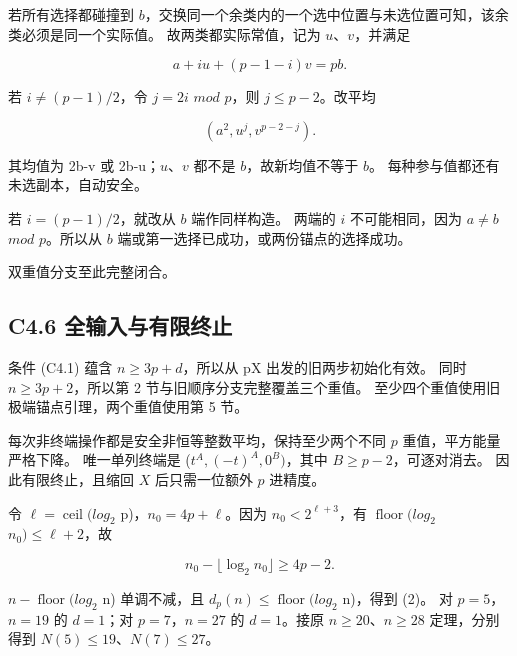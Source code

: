 {若所有选择都碰撞到} {\ensuremath{b}，交换同一个余类内的一个选中位置与未选位置可知，该余类必须是同一个实际值。} {故两类都实际常值，记为} {\ensuremath{u}、\ensuremath{v}，并满足}

\[
a+i u+(p-1-i)v=pb.
\tag{C4.12}
\]

{若} {\ensuremath{i\ne (p-1)/2}，令} {\ensuremath{j=2i}} {\ensuremath{mod}} {\ensuremath{p}，则} {\ensuremath{j\le p-2}。改平均}

\[
(a^2,u^j,v^{p-2-j}).
\tag{C4.13}
\]

{其均值为} {2b-v} {或} {2b-u；\ensuremath{u}、\ensuremath{v}} {都不是} {\ensuremath{b}，故新均值不等于} {\ensuremath{b}。} {每种参与值都还有未选副本，自动安全。}

{若} {\ensuremath{i=(p-1)/2}，就改从} {\ensuremath{b}} {端作同样构造。} {两端的} {\ensuremath{i}} {不可能相同，因为} {\ensuremath{a\ne b}} {\ensuremath{mod}} {\ensuremath{p}。所以从} {\ensuremath{b}} {端或第一选择已成功，或两份锚点的选择成功。}

{双重值分支至此完整闭合。}

\subsection*{\texorpdfstring{{C4.6} {全输入与有限终止}}{C4.6 全输入与有限终止}}\label{C4-h27}

{条件} {(C4.1)} {蕴含} {\ensuremath{n\ge 3p+d}，所以从} {pX} {出发的旧两步初始化有效。} {同时} {\ensuremath{n\ge 3p+2}，所以第} {2} {节与旧顺序分支完整覆盖三个重值。} {至少四个重值使用旧极端锚点引理，两个重值使用第} {5} {节。}

{每次非终端操作都是安全非恒等整数平均，保持至少两个不同} {\ensuremath{p}} {重值，平方能量严格下降。} {唯一单列终端是} {(\ensuremath{t^A,(-t)^A,0^B)}，其中} {\ensuremath{B\ge p-2}，可逐对消去。} {因此有限终止，且缩回} {\ensuremath{X}} {后只需一位额外} {\ensuremath{p}} {进精度。}

{令} {\ensuremath{\ell =\operatorname{ceil}(log_{2}}} {p)，\ensuremath{n_{0}=4p+\ell }。因为} {\ensuremath{n_{0}<2^{\ell +3}}，有} {\ensuremath{\operatorname{floor}(log_{2}}} {\ensuremath{n_{0})\le \ell +2}，故}

\[
n_0-\lfloor\log_2 n_0\rfloor\ge4p-2.
\]

{\ensuremath{n-\operatorname{floor}(log_{2}}} {n)} {单调不减，且} {\ensuremath{d_{p}(n)\le \operatorname{floor}(log_{2}}} {n)，得到} {(2)。} {对} {\ensuremath{p=5}，\ensuremath{n=19}} {的} {\ensuremath{d=1}；对} {\ensuremath{p=7}，\ensuremath{n=27}} {的} {\ensuremath{d=1}。接原} {\ensuremath{n\ge 20}、\ensuremath{n\ge 28}} {定理，分别得到} {\ensuremath{N(5)\le 19}、\ensuremath{N(7)\le 27}。}


